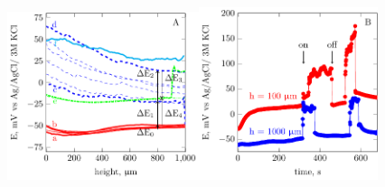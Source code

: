 \documentclass[3p]{elsarticle}
\providecommand{\DIFaddend}{} %
\begin{document}
\DIFaddend \begin{figure}
\centering
\includegraphics[width=0.5\textwidth]{field-figure0.pdf}\includegraphics[width=0.466\textwidth]{field-figure1.pdf}

\end{figure}
\end{document}
